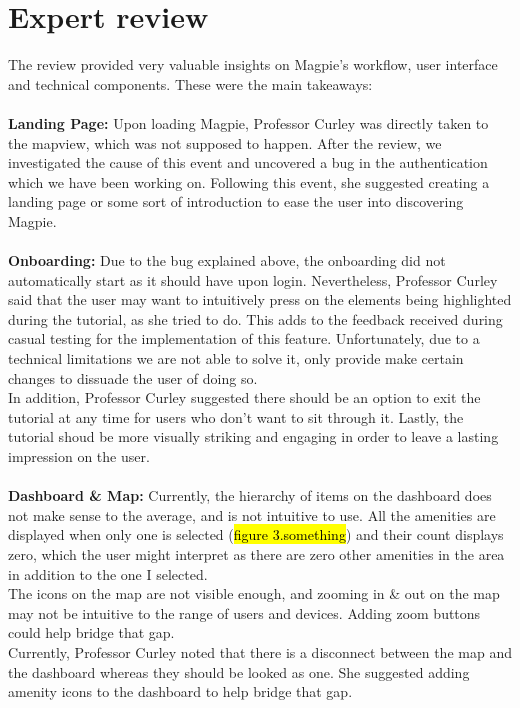 \documentclass{report}
\begin{document}
\section{Expert review}
The review provided very valuable insights on Magpie's workflow, user interface and technical components. These were the main takeaways:\\ \\
\textbf{Landing Page: }
Upon loading Magpie, Professor Curley was directly taken to the mapview, which was not supposed to happen. After the review, we investigated the cause of this event and uncovered a bug in the authentication which we have been working on. Following this event, she suggested creating a landing page or some sort of introduction to ease the user into discovering Magpie.\\ \\
\textbf{Onboarding: }
Due to the bug explained above, the onboarding did not automatically start as it should have upon login. Nevertheless, Professor Curley said that the user may want to intuitively press on the elements being highlighted during the tutorial, as she tried to do. This adds to the feedback received during casual testing for the implementation of this feature. Unfortunately, due to a technical limitations we are not able to solve it, only provide make certain changes to dissuade the user of doing so.\\
In addition, Professor Curley suggested there should be an option to exit the tutorial at any time for users who don't want to sit through it. Lastly, the tutorial shoud be more visually striking and engaging in order to leave a lasting impression on the user.\\ \\
\textbf{Dashboard \& Map: }
Currently, the hierarchy of items on the dashboard does not make sense to the average, and is not intuitive to use. All the amenities are displayed when only one is selected (\hl{figure 3.something}) and their count displays zero, which the user might interpret as there are zero other amenities in the area in addition to the one I selected.\\
The icons on the map are not visible enough, and zooming in \& out on the map may not be intuitive to the range of users and devices. Adding zoom buttons could help bridge that gap. \\
Currently, Professor Curley noted that there is a disconnect between the map and the dashboard whereas they should be looked as one. She suggested adding amenity icons to the dashboard to help bridge that gap.\\ \\
\end{document}
